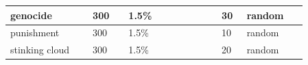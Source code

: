 \begin{longtable}{|>{\RaggedRight}p{0.23497\linewidth}|>{\RaggedRight}p{0.10823\linewidth}|>{\RaggedRight}p{0.26606\linewidth}|>{\RaggedRight}p{0.07394\linewidth}|>{\RaggedRight}p{0.17393\linewidth}|}
\hspace*{0pt}\ignorespaces{}\hspace*{0pt}genocide\footnotemark[58]&\hspace*{0pt}\ignorespaces{}\hspace*{0pt}300&\hspace*{0pt}\ignorespaces{}\hspace*{0pt}1.5\%&\hspace*{0pt}\ignorespaces{}\hspace*{0pt}30&\hspace*{0pt}\ignorespaces{}\hspace*{0pt}random\footnotemark[59]\\ \hline \hspace*{0pt}\ignorespaces{}\hspace*{0pt}punishment\footnotemark[60]&\hspace*{0pt}\ignorespaces{}\hspace*{0pt}300&\hspace*{0pt}\ignorespaces{}\hspace*{0pt}1.5\%&\hspace*{0pt}\ignorespaces{}\hspace*{0pt}10&\hspace*{0pt}\ignorespaces{}\hspace*{0pt}random\footnotemark[61]\\ \hline \hspace*{0pt}\ignorespaces{}\hspace*{0pt}stinking cloud\footnotemark[62]&\hspace*{0pt}\ignorespaces{}\hspace*{0pt}300&\hspace*{0pt}\ignorespaces{}\hspace*{0pt}1.5\%&\hspace*{0pt}\ignorespaces{}\hspace*{0pt}20&\hspace*{0pt}\ignorespaces{}\hspace*{0pt}random\footnotemark[63]\\ \hline 
\end{longtable}

